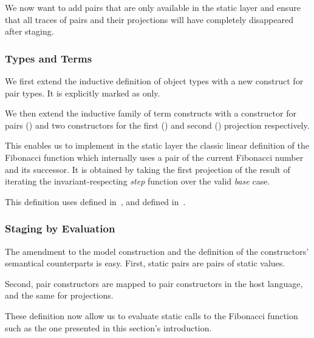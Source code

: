 We now want to add pairs that are only available in the static
layer and ensure that all traces of pairs and their projections
will have completely disappeared after staging.

\subsubsection{Types and Terms}

We first extend the inductive definition of object types
with a new construct for pair types. It is explicitly
marked as  only.


We then extend the inductive family of term constructs
with a constructor for pairs () and two constructors
for the first () and second () projection
respectively.


This enables us to implement in the static layer the classic
linear definition of the Fibonacci function which internally
uses a pair of the current Fibonacci number and its successor.
%
It is obtained by taking the first projection of the result
of iterating the invariant-respecting \emph{step} function
over the valid \emph{base} case.


This definition uses  defined in~,
and  defined in~.

\subsubsection{Staging by Evaluation}

The amendment to the model construction and the definition of the
constructors' semantical counterparts is easy.
%
First, static pairs are pairs of static values.


Second, pair constructors are mapped to pair constructors in
the host language, and the same for projections.


These definition now allow us to evaluate static calls to the Fibonacci
function such as the one presented in this section's introduction.


